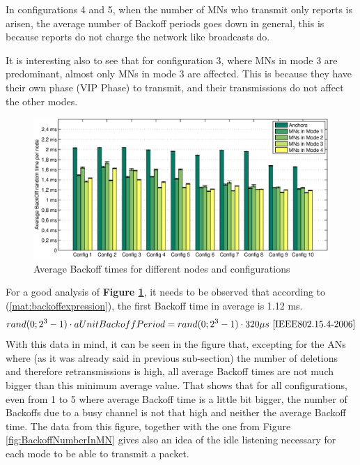 In configurations 4 and 5, when the number of \acp{MN} who transmit only reports is arisen, the average number of Backoff periods goes down in general,
this is because reports do not charge the network like broadcasts do.

It is interesting also to see that for configuration 3, where \acp{MN} in mode 3 are predominant, almost only \acp{MN} in mode 3 are affected. This is
because they have their own phase (\ac{VIP} Phase) to transmit, and their transmissions do not affect the other modes.

\begin{figure}[ht]
 \begin{center}
  \includegraphics[width=1\textwidth]{averageBackoffTimeANandMN.eps}
 \end{center}
 \caption{Average Backoff times for different nodes and configurations}
 \label{fig:averageBackoffTimeANandMN}
\end{figure}

For a good analysis of \textbf{Figure \ref{fig:averageBackoffTimeANandMN}}, it needs to be observed that according to (\ref{mat:backoffexpression}),
the first Backoff time in average is 1.12 ms.
\begin{equation}
  rand(0;  2^3-1)\cdot aUnitBackoffPeriod = rand(0; 2^3-1)\cdot 320\mu s\ \cite{IEEE802.15.4-2006}
  \label{mat:backoffexpression}
\end{equation}
With this data in mind, it can be seen in the figure that, excepting for the \acp{AN} where (as it was already said in previous sub-section) the 
number of deletions and therefore retransmissions is high, all average Backoff times are not much bigger than this minimum average value. That shows that for
all configurations, even from 1 to 5 where average Backoff time is a little bit bigger, the number of Backoffs due to a busy channel is not that high and 
neither the average Backoff time. The data from this figure, together with the one from Figure \ref{fig:BackoffNumberInMN} gives
also an idea of the idle listening necessary for each mode to be able to transmit a packet.

